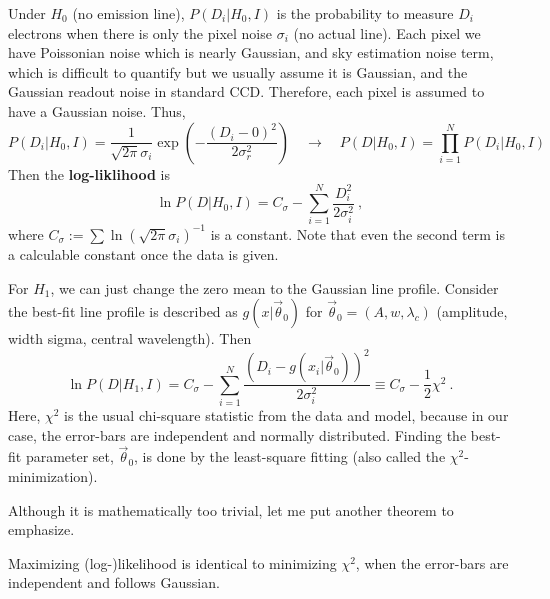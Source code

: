Under $H_0$ (no emission line), $P(D_i | H_0, I) $ is the probability to measure $D_i$ electrons when there is only the pixel noise $\sigma_i$ (no actual line). Each pixel we have Poissonian noise which is nearly Gaussian, and sky estimation noise term, which is difficult to quantify but we usually assume it is Gaussian, and the Gaussian readout noise in standard CCD. Therefore, each pixel is assumed to have a Gaussian noise. Thus,
\begin{equation*}
  P(D_i | H_0, I) = \frac{1}{\sqrt{2 \pi} \sigma_i} \exp{ \left ( -\frac{(D_i - 0)^2}{2 \sigma_r^2} \right )} 
  \quad\rightarrow\quad
  P(D|H_0, I) =  \prod_{i=1}^{N} P(D_i | H_0, I)
\end{equation*}
Then the \textbf{log-liklihood} is
\begin{equation}\label{eq: log-l H0}
  \ln P(D|H_0, I)
    = C_\sigma
      - \sum_{i=1}^{N} \frac{D_i^2}{2 \sigma_i^2} ~,
\end{equation}
where $ C_\sigma := \sum \ln (\sqrt{2 \pi} \sigma_i)^{-1} $ is a constant. Note that even the second term is a calculable constant once the data is given.

For $H_1$, we can just change the zero mean to the Gaussian line profile. Consider the best-fit line profile is described as $ g(x| \vec{\theta}_0) $ for $ \vec{\theta}_0 = (A, w, \lambda_c) $ (amplitude, width sigma, central wavelength). Then
\begin{equation}\label{eq: log-l H1}
  \ln P(D|H_1, I)
    = C_\sigma
      - \sum_{i=1}^{N} \frac{(D_i - g(x_i|\vec{\theta}_0))^2}{2 \sigma_i^2} 
    \equiv C_\sigma - \frac{1}{2}\chi^2
      ~.
\end{equation}
Here, $ \chi^2 $ is the usual chi-square statistic from the data and model, because in our case, the error-bars are independent and normally distributed. Finding the best-fit parameter set, $ \vec{\theta}_0 $, is done by the least-square fitting (also called the $ \chi^2 $-minimization). 

Although it is mathematically too trivial, let me put another theorem to emphasize.
\begin{thm}
Maximizing (log-)likelihood is identical to minimizing $ \chi^2 $, when the error-bars are independent and follows Gaussian.
\end{thm}

